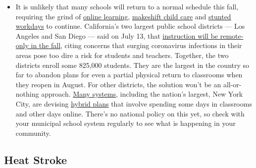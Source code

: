 \begin{itemize}
  \begin{itemize}
  \tightlist
  \item
    It is unlikely that many schools will return to a normal schedule
    this fall, requiring the grind of
    \href{https://www.nytimes.com/2020/06/05/us/coronavirus-education-lost-learning.html?action=click\&pgtype=Article\&state=default\&region=MAIN_CONTENT_3\&context=storylines_faq}{online
    learning},
    \href{https://www.nytimes.com/2020/05/29/us/coronavirus-child-care-centers.html?action=click\&pgtype=Article\&state=default\&region=MAIN_CONTENT_3\&context=storylines_faq}{makeshift
    child care} and
    \href{https://www.nytimes.com/2020/06/03/business/economy/coronavirus-working-women.html?action=click\&pgtype=Article\&state=default\&region=MAIN_CONTENT_3\&context=storylines_faq}{stunted
    workdays} to continue. California's two largest public school
    districts --- Los Angeles and San Diego --- said on July 13, that
    \href{https://www.nytimes.com/2020/07/13/us/lausd-san-diego-school-reopening.html?action=click\&pgtype=Article\&state=default\&region=MAIN_CONTENT_3\&context=storylines_faq}{instruction
    will be remote-only in the fall}, citing concerns that surging
    coronavirus infections in their areas pose too dire a risk for
    students and teachers. Together, the two districts enroll some
    825,000 students. They are the largest in the country so far to
    abandon plans for even a partial physical return to classrooms when
    they reopen in August. For other districts, the solution won't be an
    all-or-nothing approach.
    \href{https://bioethics.jhu.edu/research-and-outreach/projects/eschool-initiative/school-policy-tracker/}{Many
    systems}, including the nation's largest, New York City, are
    devising
    \href{https://www.nytimes.com/2020/06/26/us/coronavirus-schools-reopen-fall.html?action=click\&pgtype=Article\&state=default\&region=MAIN_CONTENT_3\&context=storylines_faq}{hybrid
    plans} that involve spending some days in classrooms and other days
    online. There's no national policy on this yet, so check with your
    municipal school system regularly to see what is happening in your
    community.
  \end{itemize}
\end{itemize}

\hypertarget{heat-stroke}{%
\subsection{Heat Stroke}\label{heat-stroke}}

